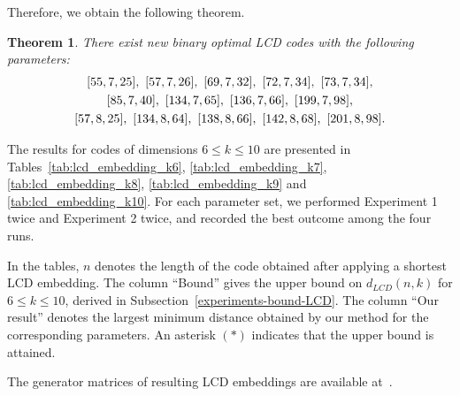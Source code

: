 \documentclass{article}
\newtheorem{theorem}{Theorem}[section]
\theoremstyle{definition}
\theoremstyle{remark}
\begin{document}
Therefore, we obtain the following theorem.

\begin{theorem}\label{thm:new-optimal-lcd-codes}
There exist new binary optimal LCD codes with the following parameters:
\[
\begin{gathered}
\relax [55,7,25],\ [57,7,26],\ [69,7,32],\ [72,7,34],\ [73,7,34],\\
[85,7,40],\ [134,7,65],\ [136,7,66],\ [199,7,98],\\
[57,8,25],\ [134,8,64],\ [138,8,66],\ [142,8,68],\ [201,8,98].
\end{gathered}
\]
\end{theorem}


The results for codes of dimensions $6\leq k\leq 10$ are presented in Tables~\ref{tab:lcd_embedding_k6}, \ref{tab:lcd_embedding_k7}, \ref{tab:lcd_embedding_k8}, \ref{tab:lcd_embedding_k9} and \ref{tab:lcd_embedding_k10}. For each parameter set, we performed Experiment 1 twice and Experiment 2 twice, and recorded the best outcome among the four runs.

In the tables, $n$ denotes the length of the code obtained after applying a shortest LCD embedding. The column ``Bound'' gives the upper bound on $d_{LCD}(n,k)$ for $6\leq k\leq 10$, derived in Subsection~\ref{experiments-bound-LCD}. The column ``Our result'' denotes the largest minimum distance obtained by our method for the corresponding parameters. An asterisk $(*)$ indicates that the upper bound is attained.

The generator matrices of resulting LCD embeddings are available at~\cite{github}.
\end{document}
